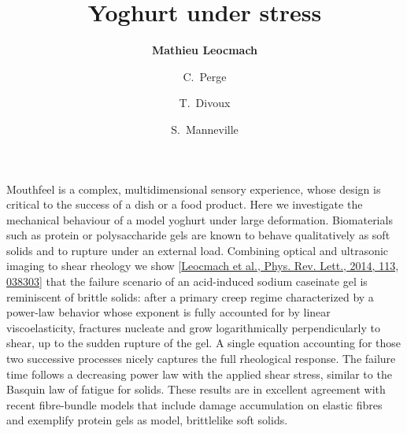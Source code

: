 \documentclass[onecolumn,12pt,tightenlines, a4paper,superscriptaddress,notitlepage]{revtex4-1}
\begin{document}
\title{Yoghurt under stress}

\author{\bf Mathieu Leocmach}
\author{C.~Perge}
\author{T.~Divoux}
\author{S.~Manneville}

\maketitle

Mouthfeel is a complex, multidimensional  sensory experience, whose design is critical to the success of a dish or a food product. Here we investigate the mechanical behaviour of a model yoghurt under large deformation. Biomaterials such as protein or polysaccharide gels are known to behave qualitatively as soft solids and to rupture under an external load. Combining optical and ultrasonic imaging to shear rheology we show [\href{http://link.aps.org/doi/10.1103/PhysRevLett.113.038303}{Leocmach et al., Phys. Rev. Lett., 2014, 113, 038303}] that the failure scenario of an acid-induced sodium caseinate gel is reminiscent of brittle solids: after a primary creep regime characterized by a power-law behavior whose exponent is fully accounted for by linear viscoelasticity, fractures nucleate and grow logarithmically perpendicularly to shear, up to the sudden rupture of the gel. A single equation accounting for those two successive processes nicely captures the full rheological response. The failure time follows a decreasing power law with the applied shear stress, similar to the Basquin law of fatigue for solids. These results are in excellent agreement with recent fibre-bundle models that include damage accumulation on elastic fibres and exemplify protein gels as model, brittlelike soft solids.
\end{document}
